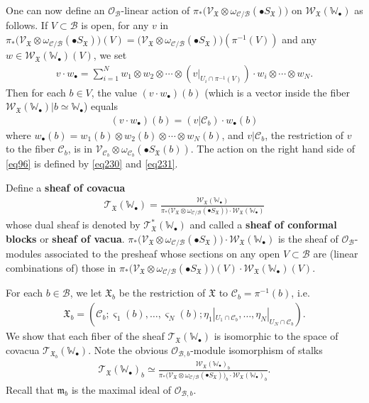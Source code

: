 \documentclass[12pt,a4paper,notitlepage]{report}
\theoremstyle{definition}
\theoremstyle{plain}
\newcommand{\fk}{\mathfrak}
\newcommand{\mc}{\mathcal}
\newcommand{\wtd}{\widetilde}
\newcommand{\scr}{\mathscr}
\newcommand{\sgm}{\varsigma}
\newcommand{\blt}{\bullet}
\newcommand{\Wbb}{\mathbb W}
\numberwithin{equation}{section}
\begin{document}
One can now define an $\scr O_{\mc B}$-linear action of $\pi_*\big(\scr V_{\fk X}\otimes\omega_{\mc C/\mc B}(\blt S_{\fk X})\big)$ on $\scr W_{\fk X}(\Wbb_\blt)$ as follows. If $V\subset\mc B$ is open, for any $v$ in $\pi_*\big(\scr V_{\fk X}\otimes\omega_{\mc C/\mc B}(\blt S_{\fk X})\big)(V)=\big(\scr V_{\fk X}\otimes\omega_{\mc C/\mc B}(\blt S_{\fk X})\big)(\pi^{-1}(V))$ and any $w\in\scr W_{\fk X}(\Wbb_\blt)(V)$, we set
\begin{align}
v\cdot w_\blt=\sum_{i=1}^N w_1\otimes w_2\otimes\cdots \otimes (v|_{U_i\cap\pi^{-1}(V)})\cdot w_i \otimes\cdots\otimes w_N.\label{eq152}
\end{align}
Then for each $b\in V$, the value $(v\cdot w_\blt)(b)$ (which is a vector inside the fiber $\scr W_{\fk X}(\Wbb_\blt)|b\simeq \Wbb_\blt$) equals
\begin{align}
(v\cdot w_\blt)(b)=(v|{\mc C_b})\cdot w_\blt(b)\label{eq96}
\end{align}
where $w_\blt(b)=w_1(b)\otimes w_2(b)\otimes\cdots\otimes w_N(b)$, and $v|{\mc C_b}$, the restriction of $v$ to the fiber $\mc C_b$, is in $\scr V_{\mc C_b}\otimes\omega_{\mc C_b}(\blt S_{\fk X}(b))$. The action on the right hand side of \eqref{eq96} is defined by \eqref{eq230} and \eqref{eq231}.

Define a \textbf{sheaf of covacua} \index{T@$\scr T_{\fk X}(\Wbb_\blt),\scr T_{\fk X}^*(\Wbb_\blt)$}
\begin{gather}
\scr T_{\fk X}(\Wbb_\blt)=\frac{\scr W_{\fk X}(\Wbb_\blt)}{\pi_*\big(\scr V_{\fk X}\otimes\omega_{\mc C/\mc B}(\blt S_{\fk X})\big)\cdot \scr W_{\fk X}(\Wbb_\blt)}\label{eq99}
\end{gather}
whose dual sheaf is denoted by $\scr T_{\fk X}^*(\Wbb_\blt)$ and called a \textbf{sheaf of conformal blocks} or \textbf{sheaf of vacua}. $\pi_*\big(\scr V_{\fk X}\otimes\omega_{\mc C/\mc B}(\blt S_{\fk X})\big)\cdot \scr W_{\fk X}(\Wbb_\blt)$ is the sheaf of $\scr O_{\mc B}$-modules associated to the presheaf whose sections on any open $V\subset\mc B$ are (linear combinations of) those in $\pi_*\big(\scr V_{\fk X}\otimes\omega_{\mc C/\mc B}(\blt S_{\fk X})\big)(V)\cdot \scr W_{\fk X}(\Wbb_\blt)(V)$. 

For each $b\in\mc B$, we let $\fk X_b$ be the restriction of $\fk X$ to $\mc C_b=\pi^{-1}(b)$, i.e. \index{XX@$\wtd {\fk X}$ and $\fk X$!$\fk X_b$}
\begin{align*}
\fk X_b=(\mc C_b;\sgm_1(b),\dots,\sgm_N(b);\eta_1|_{U_1\cap\mc C_b},\dots,\eta_N|_{U_N\cap\mc C_b}).
\end{align*}
We show that each fiber of the sheaf $\scr T_{\fk X}(\Wbb_\blt)$ is isomorphic to the space of covacua $\scr T_{\fk X_b}(\Wbb_\blt)$. Note the obvious $\scr O_{\mc B,b}$-module isomorphism of  stalks
\begin{gather}
\scr T_{\fk X}(\Wbb_\blt)_b\simeq \frac{\scr W_{\fk X}(\Wbb_\blt)_b}{\pi_*\big(\scr V_{\fk X}\otimes\omega_{\mc C/\mc B}(\blt S_{\fk X})\big)_b\cdot \scr W_{\fk X}(\Wbb_\blt)_b}.\label{eq95}
\end{gather}
Recall that $\fk m_b$ is the maximal ideal of $\scr O_{\mc B,b}$.
\end{document}
